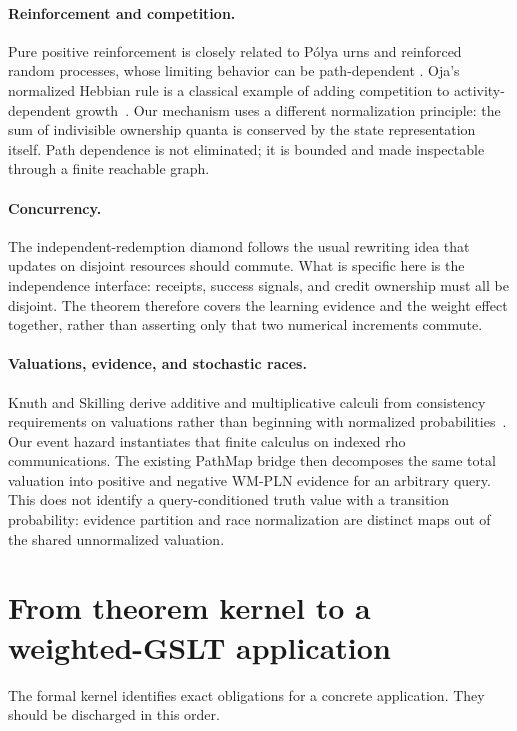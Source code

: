 \documentclass[11pt]{article}
\newcommand{\GSLT}{\textup{GSLT}}
\begin{document}
\paragraph{Reinforcement and competition.}
Pure positive reinforcement is closely related to P\'olya urns and reinforced
random processes, whose limiting behavior can be path-dependent
\cite{pemantle2007}.  Oja's normalized Hebbian rule is a classical example of
adding competition to activity-dependent growth~\cite{oja1982}.  Our mechanism
uses a different normalization principle: the sum of indivisible ownership
quanta is conserved by the state representation itself.  Path dependence is
not eliminated; it is bounded and made inspectable through a finite reachable
graph.

\paragraph{Concurrency.}
The independent-redemption diamond follows the usual rewriting idea that
updates on disjoint resources should commute.  What is specific here is the
independence interface: receipts, success signals, and credit ownership must
all be disjoint.  The theorem therefore covers the learning evidence and the
weight effect together, rather than asserting only that two numerical
increments commute.

\paragraph{Valuations, evidence, and stochastic races.}
Knuth and Skilling derive additive and multiplicative calculi from consistency
requirements on valuations rather than beginning with normalized
probabilities~\cite{knuthSkilling2012}.  Our event hazard instantiates that
finite calculus on indexed rho communications.  The existing PathMap bridge
then decomposes the same total valuation into positive and negative WM-PLN
evidence for an arbitrary query.  This does not identify a query-conditioned
truth value with a transition probability: evidence partition and race
normalization are distinct maps out of the shared unnormalized valuation.

\section{From theorem kernel to a weighted-\GSLT{} application}
\label{sec:roadmap}

The formal kernel identifies exact obligations for a concrete application.
They should be discharged in this order.
\end{document}
